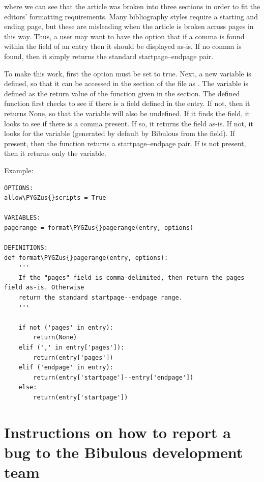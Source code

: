 \documentclass[letterpaper,10pt,english]{sphinxmanual}
\def\PYGZus{\char`\_}
\begin{document}
where we can see that the article was broken into three sections in order to fit the editors' formatting requirements. Many bibliography styles require a starting and ending page, but these are misleading when the article is broken across pages in this way. Thus, a user may want to have the option that if a comma is found within the  field of an entry then it should be displayed as-is. If no comma is found, then it simply returns the standard startpage--endpage pair.

To make this work, first the option  must be set to true. Next, a new  variable is defined, so that it can be accessed in the  section of the file as . The variable is defined as the return value of the function  given in the  section. The defined function first checks to see if there is a  field defined in the entry. If not, then it returns None, so that the  variable will also be undefined. If it finds the  field, it looks to see if there is a comma present. If so, it returns the field as-is. If not, it looks for the  variable (generated by default by Bibulous from the  field). If present, then the function returns a startpage--endpage pair. If  is not present, then it returns only the  variable.

Example:

\begin{Verbatim}[commandchars=\\\{\}]
OPTIONS:
allow\PYGZus{}scripts = True

VARIABLES:
pagerange = format\PYGZus{}pagerange(entry, options)

DEFINITIONS:
def format\PYGZus{}pagerange(entry, options):
    '''
    If the "pages" field is comma-delimited, then return the pages field as-is. Otherwise
    return the standard startpage--endpage range.
    '''

    if not ('pages' in entry):
        return(None)
    elif (',' in entry['pages']):
        return(entry['pages'])
    elif ('endpage' in entry):
        return(entry['startpage']--entry['endpage'])
    else:
        return(entry['startpage'])
\end{Verbatim}


\chapter{Instructions on how to report a bug to the Bibulous development team}
\label{instructions_for_reporting_bugs:instructions-on-how-to-report-a-bug-to-the-bibulous-development-team}\label{instructions_for_reporting_bugs::doc}
\end{document}
